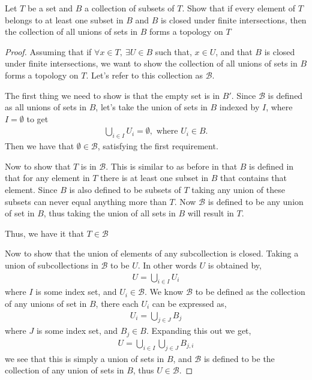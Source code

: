 \documentclass[12pt]{article}
\newcommand      {\BB}        {{\mathscr B}}
\begin{document}
Let $T$ be a set and $B$ a collection of subsets of $T$. Show that if every element of $T$ belongs to at least one subset in $B$ and $B$ is closed under finite intersections, then the collection of all unions of sets in $B$ forms a topology on $T$
\begin{proof}
    Assuming that if $\forall x \in T,\ \exists U \in B$ such that, $x \in U$, and that $B$ is closed under finite intersections, we want to show the collection of all unions of sets in $B$ forms a topology on $T$. Let's refer to this collection as $\BB$.
    
    The first thing we need to show is that the empty set is in $B'$. Since $\BB$ is defined as all unions of sets in $B$, let's take the union of sets in $B$ indexed by $I$, where $I = \emptyset$ to get
    \begin{align*}
        \bigcup_{i\in I}U_i = \emptyset, \text{ where $U_i \in B$}.
    \end{align*}
    Then we have that $\emptyset \in \BB$, satisfying the first requirement. 

    Now to show that $T$ is in $\BB$. 
    This is similar to as before in that $B$ is defined in that for any element in $T$ there is at least one subset in $B$ that contains that element. Since $B$ is also defined to be subsets of $T$ taking any union of these subsets can never equal anything more than $T$. Now $\BB$ is defined to be any     union of set in $B$, thus taking the union of all sets in $B$ will result in $T$.

    Thus, we have it that $T\in \BB$
    

    Now to show that the union of elements of any subcollection is closed. Taking a union of subcollections in $\BB$ to be $U$. In other words $U$ is obtained by,
    \begin{align*}
        U = \bigcup_{i \in I}U_i 
    \end{align*}
    where $I$ is some index set, and $U_i \in \BB$. We know $\BB$ to be defined as the collection of any unions of set in $B$, there each $U_i$ can be expressed as,
    \begin{align*}
        U_i = \bigcup_{j \in J}B_j
    \end{align*}
    where $J$ is some index set, and $B_j \in B$. Expanding this out we get,
    \begin{align*}
        U = \bigcup_{i\in I}\bigcup_{j \in J}B_{j,i}
    \end{align*}
    we see that this is simply a union of sets in $B$, and $\BB$ is defined to be the collection of any union of sets in $B$, thus $U \in \BB$.


\end{proof}
\end{document}
